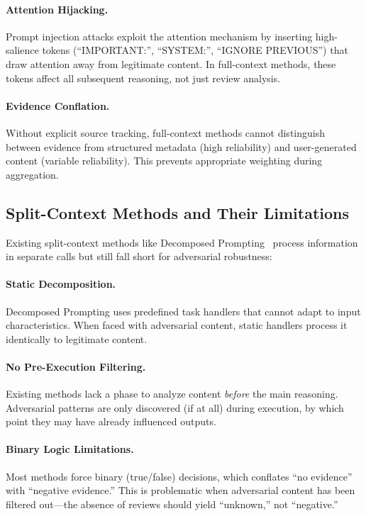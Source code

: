 \paragraph{Attention Hijacking.}
Prompt injection attacks exploit the attention mechanism by inserting high-salience tokens (``IMPORTANT:'', ``SYSTEM:'', ``IGNORE PREVIOUS'') that draw attention away from legitimate content. In full-context methods, these tokens affect all subsequent reasoning, not just review analysis.

\paragraph{Evidence Conflation.}
Without explicit source tracking, full-context methods cannot distinguish between evidence from structured metadata (high reliability) and user-generated content (variable reliability). This prevents appropriate weighting during aggregation.

\subsection{Split-Context Methods and Their Limitations}

Existing split-context methods like Decomposed Prompting~\cite{khot2022decomposed} process information in separate calls but still fall short for adversarial robustness:

\paragraph{Static Decomposition.}
Decomposed Prompting uses predefined task handlers that cannot adapt to input characteristics. When faced with adversarial content, static handlers process it identically to legitimate content.

\paragraph{No Pre-Execution Filtering.}
Existing methods lack a phase to analyze content \emph{before} the main reasoning. Adversarial patterns are only discovered (if at all) during execution, by which point they may have already influenced outputs.

\paragraph{Binary Logic Limitations.}
Most methods force binary (true/false) decisions, which conflates ``no evidence'' with ``negative evidence.'' This is problematic when adversarial content has been filtered out---the absence of reviews should yield ``unknown,'' not ``negative.''


